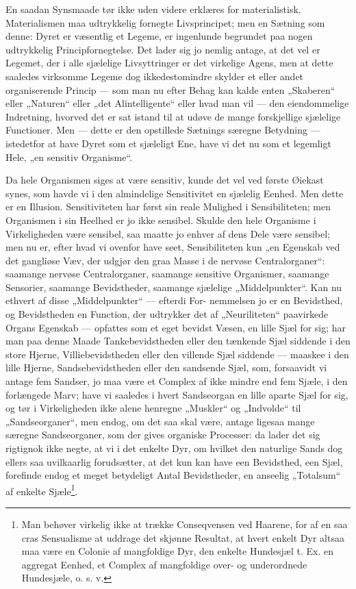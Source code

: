 \documentclass[12pt,a4paper]{book}
\begin{document}
En saadan Synsmaade tør ikke uden videre erklæres for materialistisk.
Materialismen maa udtrykkelig fornegte Livsprincipet; men en Sætning som denne:
Dyret er væsentlig et Legeme, er ingenlunde begrundet paa nogen udtrykkelig
Principfornegtelse. Det lader sig jo nemlig antage, at det vel er Legemet, der i
alle sjælelige Livsyttringer er det virkelige Agens, men at dette saaledes
virksomme Legeme dog ikkedestomindre skylder et eller andet organiserende
Princip --- som man nu efter Behag kan kalde enten „Skaberen“ eller „Naturen“
eller „det Alintelligente“ eller hvad man vil --- den eiendommelige Indretning,
hvorved det er sat istand til at udøve de mange forskjellige sjælelige
Functioner. Men --- dette er den opstillede Sætnings særegne Betydning ---
istedetfor at have Dyret som et sjæleligt Ene, have vi det nu som et legemligt
Hele, „en sensitiv Organisme“.

Da hele Organismen siges at være sensitiv, kunde det vel ved første Øiekast
synes, som havde vi i den almindelige Sensitivitet en sjælelig Eenhed. Men dette
er en Illusion. Sensitiviteten har først sin reale Mulighed i Sensibiliteten;
men Organismen i sin Heelhed er jo ikke sensibel. Skulde den hele Organisme i
Virkeligheden være sensibel, saa maatte jo enhver af dens Dele være sensibel;
men nu er, efter hvad vi ovenfor have seet, Sensibiliteten kun „en Egenskab ved
det gangliøse Væv, der udgjør den graa Masse i de nervøse Centralorganer“:
saamange nervøse Centralorganer, saamange sensitive Organismer, saamange
Sensorier, saamange Bevidstheder, saamange sjælelige „Middelpunkter“. Kan nu
ethvert af disse „Middelpunkter“ --- efterdi For-
\setcounter{footnote}{0}
nemmelsen jo er en Bevidsthed, og Bevidstheden en Function, der udtrykker det af
„Neuriliteten“ paavirkede Organs Egenskab --- opfattes som et eget bevidst
Væsen, en lille Sjæl for sig; har man paa denne Maade Tankebevidstheden eller
den tænkende Sjæl siddende i den store Hjerne, Villiebevidstheden eller den
villende Sjæl siddende --- maaskee i den lille Hjerne, Sandsebevidstheden eller
den sandsende Sjæl, som, forsaavidt vi antage fem Sandser, jo maa være et
Complex af ikke mindre end fem Sjæle, i den forlængede Marv; have vi saaledes i
hvert Sandseorgan en lille aparte Sjæl for sig, og tør i Virkeligheden ikke
alene henregne „Muskler“ og „Indvolde“ til „Sandseorganer“, men endog, om det
saa skal være, antage ligesaa mange særegne Sandseorganer, som der gives
organiske Processer: da lader det sig rigtignok ikke negte, at vi i det enkelte
Dyr, om hvilket den naturlige Sands dog ellers saa uvilkaarlig forudsætter, at
det kun kan have een Bevidsthed, een Sjæl, forefinde endog et meget betydeligt
Antal Bevidstheder, en anseelig „Totalsum“ af enkelte Sjæle\footnote{Man behøver
virkelig ikke at trække Conseqvensen ved Haarene, for af en saa cras
Sensualisme at uddrage det skjønne Resultat, at hvert enkelt Dyr altsaa maa være
en Colonie af mangfoldige Dyr, den enkelte Hundesjæl t. Ex. en aggregat Eenhed,
et Complex af mangfoldige over- og underordnede Hundesjæle, o. s. v.}.
\end{document}
